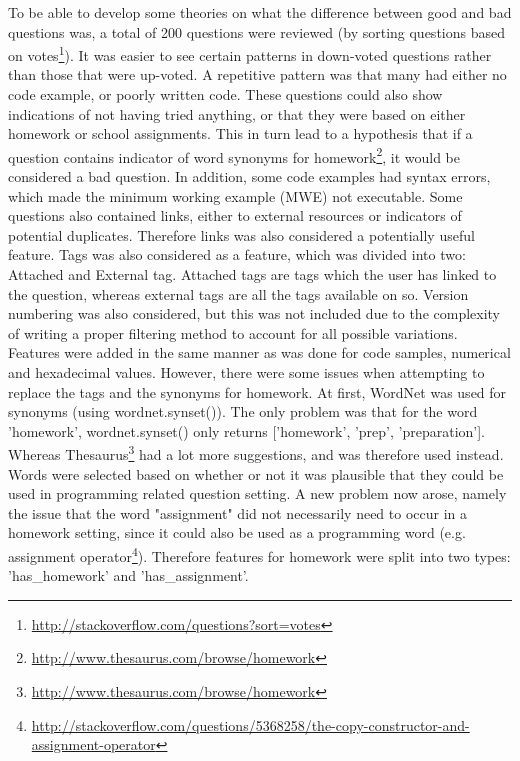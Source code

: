 To be able to develop some theories on what the difference between good and bad questions was, a total of 200 questions were reviewed (by sorting questions based on 
 votes\footnote{\url{http://stackoverflow.com/questions?sort=votes}}). 
It was easier to see certain patterns in down-voted questions rather than those that were up-voted. 
A repetitive pattern was that many had either no code example, or poorly written code. 
These questions could also show indications of not having tried anything, or that they were based on either homework or school assignments. 
This in turn lead to a hypothesis that if a question contains indicator of word synonyms for homework\footnote{\url{http://www.thesaurus.com/browse/homework}}, 
it would be considered a bad question. 
In addition, some code examples had syntax errors, which made the minimum working example (MWE) not executable. 
Some questions also contained links, either to external resources or indicators of potential duplicates. 
Therefore links was also considered a potentially useful feature. 
Tags was also considered as a feature, which was divided into two: Attached and External tag. 
Attached tags are tags which the user has linked to the question, whereas external tags are all the tags available on \gls{so}.
Version numbering was also considered, but this was not included due to the complexity of writing a proper filtering method to account for all possible variations.
\vspace{0.5em}\newline
Features were added in the same manner as was done for code samples, numerical and hexadecimal values. 
However, there were some issues when attempting to replace the tags and the synonyms for homework.
At first, WordNet was used for synonyms (using wordnet.synset()). 
The only problem was that for the word 'homework', wordnet.synset() only returns ['homework', 'prep', 'preparation'].
Whereas Thesaurus\footnote{\url{http://www.thesaurus.com/browse/homework}} had a lot more suggestions, and was therefore used instead.
Words were selected based on whether or not it was plausible that they could be used in programming related question setting.
A new problem now arose, namely the issue that the word "assignment" did not necessarily need to occur in a homework setting, since it could also be used as a programming word
(e.g. assignment operator\footnote{\url{http://stackoverflow.com/questions/5368258/the-copy-constructor-and-assignment-operator}}).
Therefore features for homework were split into two types: 'has\_homework' and 'has\_assignment'.
